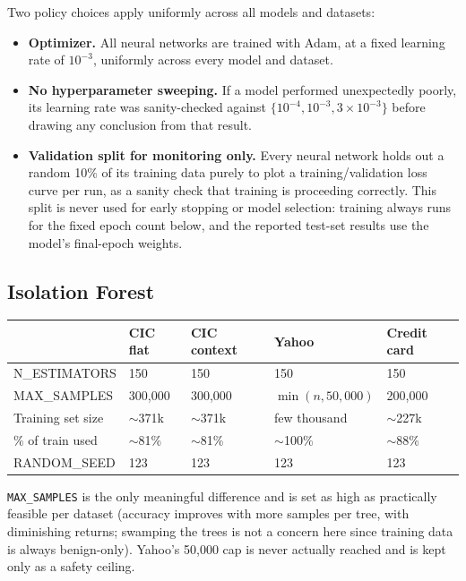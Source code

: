 Two policy choices apply uniformly across all models and datasets:

\begin{itemize}
  \item \textbf{Optimizer.} All neural networks are trained with Adam, at a fixed learning rate of $10^{-3}$, uniformly across every model and dataset.
  \item \textbf{No hyperparameter sweeping.} If a model performed unexpectedly poorly, its learning rate was sanity-checked against $\{10^{-4}, 10^{-3}, 3\times10^{-3}\}$ before drawing any conclusion from that result.
  \item \textbf{Validation split for monitoring only.} Every neural network holds out a random 10\% of its training data purely to plot a training/validation loss curve per run, as a sanity check that training is proceeding correctly. This split is never used for early stopping or model selection: training always runs for the fixed epoch count below, and the reported test-set results use the model's final-epoch weights.
\end{itemize}

\subsection{Isolation Forest}

\begin{center}
\begin{tabular}{@{}lllll@{}}
\toprule
 & CIC flat & CIC context & Yahoo & Credit card \\
\midrule
N\_ESTIMATORS & 150 & 150 & 150 & 150 \\
MAX\_SAMPLES & 300{,}000 & 300{,}000 & $\min(n, 50{,}000)$ & 200{,}000 \\
Training set size & $\sim$371k & $\sim$371k & few thousand & $\sim$227k \\
\% of train used & $\sim$81\% & $\sim$81\% & $\sim$100\% & $\sim$88\% \\
RANDOM\_SEED & 123 & 123 & 123 & 123 \\
\bottomrule
\end{tabular}
\end{center}

\texttt{MAX\_SAMPLES} is the only meaningful difference and is set as high as practically feasible per dataset (accuracy improves with more samples per tree, with diminishing returns; swamping the trees is not a concern here since training data is always benign-only). Yahoo's 50{,}000 cap is never actually reached and is kept only as a safety ceiling.

